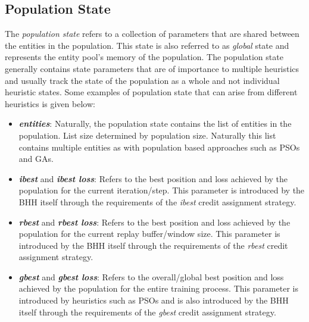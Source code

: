 \subsection{Population State}
\label{sec:bhh:entity_pool:population_state}


The \textit{population state} refers to a collection of parameters that are shared between the entities in the population. This state is also referred to as \textit{global} state and represents the entity pool's memory of the population. The population state generally contains state parameters that are of importance to multiple heuristics and usually track the state of the population as a whole and not individual heuristic states. Some examples of population state that can arise from different heuristics is given below:

\begin{itemize}
      \item \textbf{\textit{entities}}: Naturally, the population state contains the list of entities in the population. List size determined by population size. Naturally this list contains multiple entities as with population based approaches such as \acp{PSO} and \acp{GA}.

      \item \textbf{\textit{ibest}} and \textbf{\textit{ibest loss}}: Refers to the best position and loss achieved by the population for the current iteration/step. This parameter is introduced by the \ac{BHH} itself through the requirements of the \textit{ibest} credit assignment strategy.

      \item \textbf{\textit{rbest}} and \textbf{\textit{rbest loss}}: Refers to the best position and loss achieved by the population for the current replay buffer/window size. This parameter is introduced by the \ac{BHH} itself through the requirements of the \textit{rbest} credit assignment strategy.

      \item \textbf{\textit{gbest}} and \textbf{\textit{gbest loss}}: Refers to the overall/global best position and loss achieved by the population for the entire training process. This parameter is introduced by heuristics such as \acp{PSO} and is also introduced by the \ac{BHH} itself through the requirements of the \textit{gbest} credit assignment strategy.
\end{itemize}

